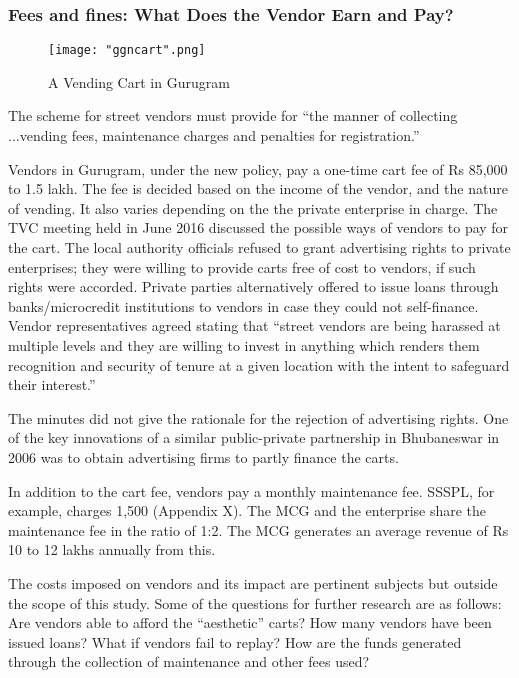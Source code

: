 \documentclass[a4paper, 12pt, twoside]{article}
\begin{document}
\subsubsection{Fees and fines: What Does the Vendor Earn and Pay?}

\begin{wrapfigure}{l}{0.65\textwidth}
\centering
\texttt{[image: "ggncart".png]}
\caption{A Vending Cart in Gurugram}
\end{wrapfigure} 

The scheme for street vendors must provide for “the manner of collecting ...vending fees, maintenance charges and penalties for registration.”

Vendors in Gurugram, under the new policy, pay a one-time cart fee of Rs 85,000 to 1.5 lakh. The fee is decided based on the income of the vendor, and the nature of vending. It also varies depending on the the private enterprise in charge. The TVC meeting held in June 2016 discussed the possible ways of vendors to pay for the cart. The local authority officials refused to grant advertising rights to private enterprises; they were willing to provide carts free of cost to vendors, if such rights were accorded. Private parties alternatively offered to issue loans through banks/microcredit institutions to vendors in case they could not self-finance. Vendor representatives agreed stating that “street vendors are being harassed at multiple levels and they are willing to invest in anything which renders them recognition and security of tenure at a given location with the intent to safeguard their interest.”

The minutes did not give the rationale for the rejection of advertising rights. One of the key innovations of a similar public-private partnership in Bhubaneswar in 2006 was to obtain advertising firms to partly finance the carts. 

In addition to the cart fee, vendors pay a monthly maintenance fee. SSSPL, for example, charges 1,500 (Appendix X). The MCG and the enterprise share the maintenance fee in the ratio of 1:2. The MCG generates an average revenue of Rs 10 to 12 lakhs annually from this. 

The costs imposed on vendors and its impact are pertinent subjects but outside the scope of this study. Some of the questions for further research are as follows: Are vendors able to afford the “aesthetic” carts? How many vendors have been issued loans? What if vendors fail to replay? How are the funds generated through the collection of maintenance and other fees used?
\end{document}
